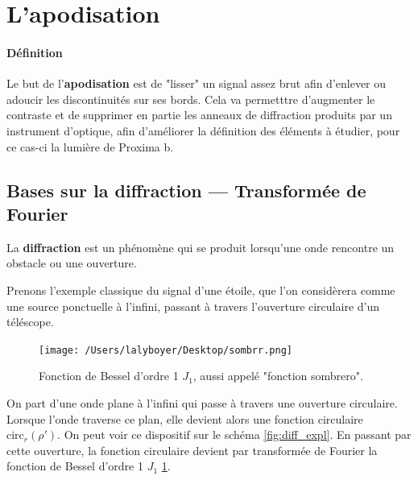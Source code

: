 \section{\centering L'apodisation}

\paragraph{Définition} Le but de l'\textbf{apodisation} est de "lisser" un signal assez brut afin d'enlever ou adoucir les discontinuités sur ses bords. 
Cela va permetttre d'augmenter le contraste et de supprimer en partie les anneaux de diffraction produits par un instrument d'optique, afin d'améliorer la définition des éléments à étudier, pour ce cas-ci la lumière de Proxima b.

\subsection{Bases sur la diffraction — Transformée de Fourier}

    


La \textbf{diffraction} est un phénomène qui se produit lorsqu'une onde rencontre un obstacle ou une ouverture. 

Prenons l'exemple classique du signal d'une étoile, que l'on considèrera comme une source ponctuelle à l'infini, passant à travers l'ouverture circulaire d'un téléscope. 

\begin{figure}
    \centering
    \texttt{[image: /Users/lalyboyer/Desktop/sombrr.png]}
    \caption{Fonction de Bessel d'ordre 1 $J_1$, aussi appelé "fonction sombrero".}
    \label{fig:sombrero}
\end{figure}

On part d'une onde plane à l'infini qui passe à travers une ouverture circulaire. Lorsque l'onde traverse ce plan, elle devient alors une fonction circulaire $\text{circ}_r(\rho')$. On peut voir ce dispositif sur le schéma \ref{fig:diff_expl}.
En passant par cette ouverture, la fonction circulaire devient par transformée de Fourier la fonction de Bessel d'ordre 1 $J_1$ \ref{fig:sombrero}.

